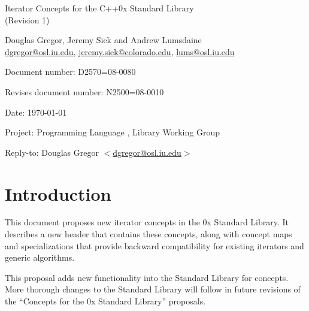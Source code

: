 \documentclass[american,twoside]{book}
\begin{document}
\raggedbottom

\begin{titlepage}
\begin{center}
\huge
Iterator Concepts for the C++0x Standard Library\\
(Revision 1)
\vspace{0.5in}

\normalsize
Douglas Gregor, Jeremy Siek and Andrew Lumsdaine \\
\href{mailto:dgregor@osl.iu.edu}{dgregor@osl.iu.edu}, \href{mailto:jeremy.siek@colorado.edu}{jeremy.siek@colorado.edu}, \href{mailto:lums@osl.iu.edu}{lums@osl.iu.edu}
\end{center}

\vspace{1in}
\par\noindent Document number: D2570=08-0080 \vspace{-6pt}
\par\noindent Revises document number: N2500=08-0010 \vspace{-6pt}
\par\noindent Date: \today\vspace{-6pt}
\par\noindent Project: Programming Language \Cpp{}, Library Working Group\vspace{-6pt}
\par\noindent Reply-to: Douglas Gregor $<$\href{mailto:dgregor@osl.iu.edu}{dgregor@osl.iu.edu}$>$\vspace{-6pt}

\section*{Introduction}
This document proposes new iterator concepts in the \Cpp0x Standard
Library. It describes a new header  that
contains these concepts, along with concept maps and
 specializations that provide backward
compatibility for existing iterators and generic algorithms.

This proposal adds new functionality into the Standard Library for
concepts. More thorough changes to the Standard Library will follow in
future revisions of the ``Concepts for the \Cpp0x Standard Library''
proposals.


\end{titlepage}
\end{document}
